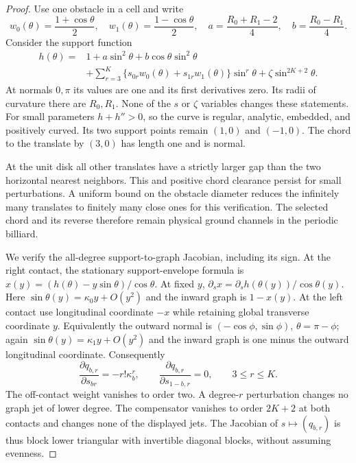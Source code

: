 \begin{proof}
Use one obstacle in a cell and write
\[
 w_0(\theta)=\frac{1+\cos\theta}{2},\quad
 w_1(\theta)=\frac{1-\cos\theta}{2},\quad
 a=\frac{R_0+R_1-2}{4},\quad b=\frac{R_0-R_1}{4}.
\]
Consider the support function
\begin{equation}\label{eq:support}
 \begin{split}
 h(\theta)={}&1+a\sin^2\theta+b\cos\theta\sin^2\theta\\
 &+\sum_{r=3}^K\{s_{0r}w_0(\theta)+s_{1r}w_1(\theta)\}
                                      \sin^r\theta
        +\zeta\sin^{2K+2}\theta.
 \end{split}
\end{equation}
At normals $0,\pi$ its values are one and its first derivatives zero.
Its radii of curvature there are $R_0,R_1$. None of the $s$ or
$\zeta$ variables changes these statements. For small parameters
$h+h''>0$, so the curve is regular, analytic, embedded, and positively
curved. Its two support points remain $(1,0)$ and $(-1,0)$.
The chord to the translate by $(3,0)$ has length one and is normal.

At the unit disk all other translates have a strictly larger gap than
the two horizontal nearest neighbors. This and positive chord clearance
persist for small perturbations. A uniform bound on the obstacle
diameter reduces the infinitely many translates to finitely many close
ones for this verification. The selected chord and its reverse
therefore remain physical ground channels in the periodic billiard.

We verify the all-degree support-to-graph Jacobian, including its sign.
At the right contact, the stationary support-envelope formula is
$x(y)=(h(\theta)-y\sin\theta)/\cos\theta$. At fixed $y$,
$\partial_s x=\partial_s h(\theta(y))/\cos\theta(y)$.
Here $\sin\theta(y)=\kappa_0y+O(y^2)$ and the inward graph is
$1-x(y)$. At the left contact use longitudinal coordinate $-x$ while
retaining global transverse coordinate $y$. Equivalently the outward
normal is $(-\cos\phi,\sin\phi)$, $\theta=\pi-\phi$;
again $\sin\theta(y)=\kappa_1y+O(y^2)$ and the inward graph
is one minus the outward longitudinal coordinate. Consequently
\begin{equation}\label{eq:supportjac}
 \frac{\partial q_{b,r}}{\partial s_{br}}=-r!\kappa_b^r,
 \qquad
 \frac{\partial q_{b,r}}{\partial s_{1-b,r}}=0,
                   \qquad 3\le r\le K.
\end{equation}
The off-contact weight vanishes to order two. A degree-$r$ perturbation
changes no graph jet of lower degree. The compensator vanishes to
order $2K+2$ at both contacts and changes none of the displayed jets.
The Jacobian of $s\mapsto(q_{b,r})$ is thus block lower triangular
with invertible diagonal blocks, without assuming evenness.


\end{proof}
